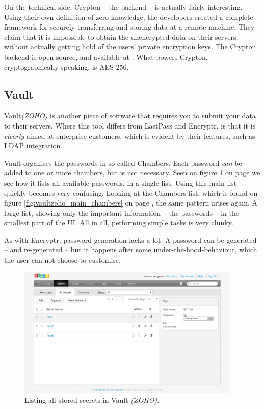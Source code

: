 			On the technical side, Crypton -- the backend -- is actually fairly interesting. Using their own definition of zero-knowledge, the developers created a complete framework for securely transferring and storing data at a remote machine\cite{crypton_paper}. They claim that it is impossible to obtain the unencrypted data on their servers, without actually getting hold of the users' private encryption keys. The Crypton backend is open source, and available at \cite{crypton_git}. What powers Crypton, cryptographically speaking, is AES-256.

		\subsection*{Vault}
			Vault\emph{(ZOHO)}\cite{vault_zoho} is another piece of software that requires you to submit your data to their servers. Where this tool differs from LastPass and Encryptr, is that it is \emph{clearly} aimed at enterprise customers, which is evident by their features, such as LDAP integration.

			Vault organises the passwords in so called Chambers. Each password \emph{can} be added to one or more chambers, but is not necessary. Seen on figure \ref{fig:vaultzoho_main_secrets} on page \pageref{fig:vaultzoho_main_secrets} we see how it lists all available passwords, in a single list. Using this main list quickly becomes very confusing. Looking at the Chambers list, which is found on figure \ref{fig:vaultzoho_main_chambers} on page \pageref{fig:vaultzoho_main_chambers}, the same pattern arises again. A large list, showing only the important information -- the passwords -- in the smallest part of the UI. All in all, performing simple tasks is very clunky.

			As with Encryptr, password generation lacks a lot. A password can be generated -- and re-generated -- but it happens after some under-the-hood-behaviour, which the user can not choose to customise.


			\begin{figure}[htbp]
				\centering
				\includegraphics[width=0.95\textwidth]{figures/analysis/vaultzoho_main_secrets.png}
				\caption{Listing all stored secrets in Vault \emph{(ZOHO)}.}
				\label{fig:vaultzoho_main_secrets}
			\end{figure}

